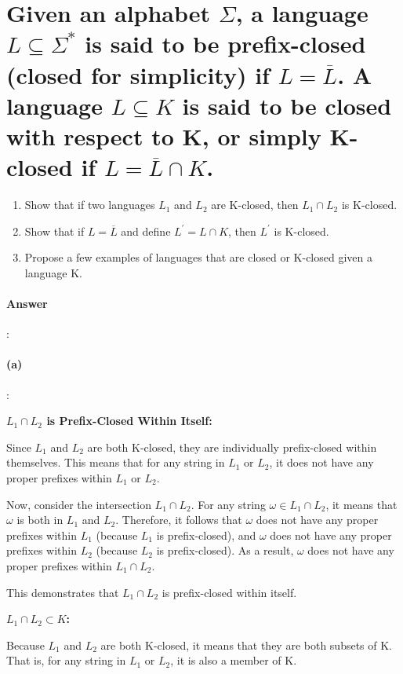 \documentclass{article}
\begin{document}
\section{Given an alphabet $\Sigma$, a language $L \subseteq  \Sigma^*$ is said to be prefix-closed (closed for simplicity) if $L = \overline{L}$. A language $L \subseteq  K$ is said to be closed with respect to K, or simply K-closed if $L = \overline{L} \cap K$.}

\begin{enumerate}[label=(\alph*)]
  \item Show that if two languages $L_1$ and $L_2$ are K-closed, then $L_1 \cap L_2$ is K-closed.
  \item Show that if $L = \overline{L}$ and define $L^\prime  = L \cap K$, then $L^\prime$ is K-closed.
  \item Propose a few examples of languages that are closed or K-closed given a language K.
\end{enumerate}

\paragraph{Answer}:

\paragraph{(a)}:

\textbf{$L_1 \cap L_2$ is Prefix-Closed Within Itself:}

Since $L_1$ and $L_2$ are both K-closed, they are individually prefix-closed within themselves. This means that for any string in $L_1$ or $L_2$, it does not have any proper prefixes within $L_1$ or $L_2$.

Now, consider the intersection $L_1 \cap L_2$. For any string $\omega \in L_1 \cap L_2$, it means that $\omega$ is both in $L_1$ and $L_2$. Therefore, it follows that $\omega$ does not have any proper prefixes within $L_1$ (because $L_1$ is prefix-closed), and $\omega$ does not have any proper prefixes within $L_2$ (because $L_2$ is prefix-closed). As a result, $\omega$ does not have any proper prefixes within $L_1 \cap L_2$.

This demonstrates that $L_1 \cap L_2$ is prefix-closed within itself.

\textbf{$L_1 \cap L_2 \subset K$:}

Because $L_1$ and $L_2$ are both K-closed, it means that they are both subsets of K. That is, for any string in $L_1$ or $L_2$, it is also a member of K.
\end{document}
